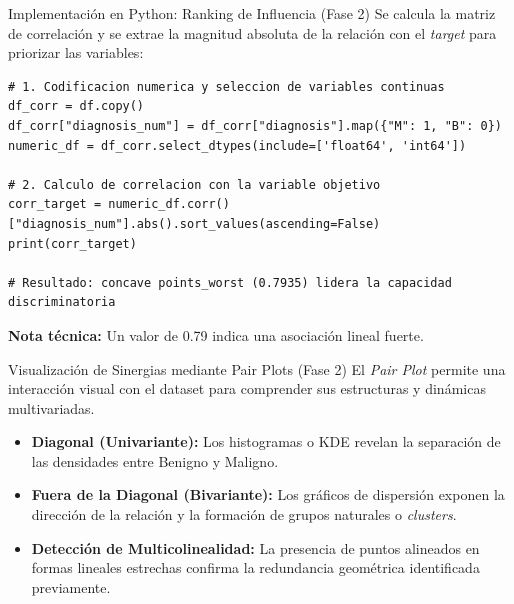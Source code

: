 \documentclass{beamer}
\begin{document}
	\begin{frame}[fragile]{Implementación en Python: Ranking de Influencia (Fase 2)}
		Se calcula la matriz de correlación y se extrae la magnitud absoluta de la relación con el \textit{target} para priorizar las variables:
		
		\begin{lstlisting}[style=colab]
# 1. Codificacion numerica y seleccion de variables continuas
df_corr = df.copy()
df_corr["diagnosis_num"] = df_corr["diagnosis"].map({"M": 1, "B": 0})
numeric_df = df_corr.select_dtypes(include=['float64', 'int64'])

# 2. Calculo de correlacion con la variable objetivo
corr_target = numeric_df.corr()["diagnosis_num"].abs().sort_values(ascending=False)
print(corr_target)

# Resultado: concave points_worst (0.7935) lidera la capacidad discriminatoria
		\end{lstlisting}
		\textbf{Nota técnica:} Un valor de 0.79 indica una asociación lineal fuerte.
	\end{frame}
	
	\begin{frame}{Visualización de Sinergias mediante Pair Plots (Fase 2)}
		El \textit{Pair Plot} permite una interacción visual con el dataset para comprender sus estructuras y dinámicas multivariadas.
		
		\begin{itemize}
			\item<2-> \textbf{Diagonal (Univariante):} Los histogramas o KDE revelan la separación de las densidades entre Benigno y Maligno.
			\item<3-> \textbf{Fuera de la Diagonal (Bivariante):} Los gráficos de dispersión exponen la dirección de la relación y la formación de grupos naturales o \textit{clusters}.
			\item<4-> \textbf{Detección de Multicolinealidad:} La presencia de puntos alineados en formas lineales estrechas confirma la redundancia geométrica identificada previamente.
		\end{itemize}
	\end{frame}
	
\end{document}
